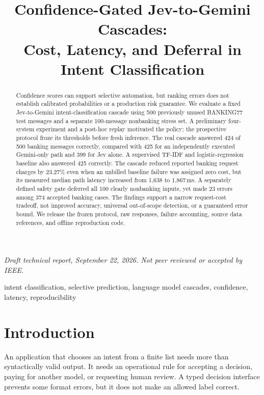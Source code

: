 \documentclass[conference]{IEEEtran}
\title{Confidence-Gated Jev-to-Gemini Cascades:\\Cost, Latency, and Deferral in Intent Classification}
\author{\IEEEauthorblockN{Mohtasham Murshid Madani}}
\begin{document}
\maketitle
\begin{center}\small\textit{Draft technical report, September 22, 2026. Not peer reviewed or accepted by IEEE.}\end{center}

\begin{abstract}
Confidence scores can support selective automation, but ranking errors does not establish calibrated probabilities or a production risk guarantee. We evaluate a fixed Jev-to-Gemini intent-classification cascade using 500 previously unused BANKING77 test messages and a separate 100-message nonbanking stress set. A preliminary four-system experiment and a post-hoc replay motivated the policy; the prospective protocol froze its thresholds before fresh inference. The real cascade answered 424 of 500 banking messages correctly, compared with 425 for an independently executed Gemini-only path and 399 for Jev alone. A supervised TF-IDF and logistic-regression baseline also answered 425 correctly. The cascade reduced reported banking request charges by 23.27\% even when an unbilled baseline failure was assigned zero cost, but its measured median path latency increased from 1,638 to 1,867\,ms. A separately defined safety gate deferred all 100 clearly nonbanking inputs, yet made 23 errors among 374 accepted banking cases. The findings support a narrow request-cost tradeoff, not improved accuracy, universal out-of-scope detection, or a guaranteed error bound. We release the frozen protocol, raw responses, failure accounting, source data references, and offline reproduction code.
\end{abstract}
\begin{IEEEkeywords}
intent classification, selective prediction, language model cascades, confidence, latency, reproducibility
\end{IEEEkeywords}

\section{Introduction}
An application that chooses an intent from a finite list needs more than syntactically valid output. It needs an operational rule for accepting a decision, paying for another model, or requesting human review. A typed decision interface prevents some format errors, but it does not make an allowed label correct.
\end{document}
